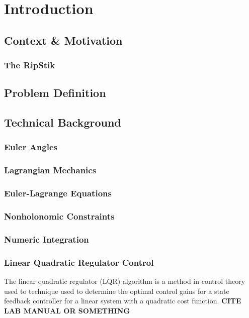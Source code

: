 \section{Introduction}
\subsection{Context \& Motivation}
\subsubsection{The RipStik}
\subsection{Problem Definition}
\subsection{Technical Background}
\subsubsection{Euler Angles}
\subsubsection{Lagrangian Mechanics}
\subsubsection{Euler-Lagrange Equations}
\subsubsection{Nonholonomic Constraints}
\subsubsection{Numeric Integration}
\subsubsection{Linear Quadratic Regulator Control}
The linear quadratic regulator (LQR) algorithm is a method in control theory used to technique used to determine the optimal control gains for a state feedback controller for a linear system with a quadratic cost function. \textbf{CITE LAB MANUAL OR SOMETHING}

